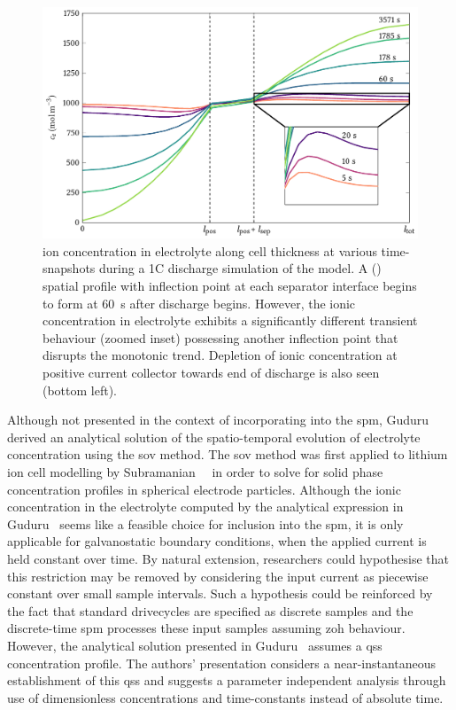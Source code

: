 \begin{figure}[!htp]
    \centering
    \includegraphics{4/figures/ce_1C_at_various_times.pdf}
    \caption[Electrolyte conc.\ (time-snapshots) along cell thickness for 1C
    discharge]{ ion concentration in electrolyte along cell thickness
        at various time-snapshots during a 1C discharge simulation of the
         model. A  () spatial
        profile  with inflection point at each separator interface begins to
        form at \approx \SI{60}{\second} after discharge begins. However, the
        ionic concentration in electrolyte exhibits a significantly different
        transient behaviour (zoomed inset) possessing another inflection point
        that disrupts the monotonic trend. Depletion of ionic concentration at
        positive current collector  towards end of discharge is also seen
    (bottom left).}
    \label{fig:ce1cdischgwithzoom}
\end{figure}

Although  not presented  in the  context  of incorporating  into the  \gls{spm},
Guduru~\etal~\cite{Guduru2012}   derived   an   analytical   solution   of   the
spatio-temporal  evolution  of  electrolyte concentration  using  the  \gls{sov}
method. The \gls{sov} method was first  applied to lithium ion cell modelling by
Subramanian~\etal~\cite{Subramanian2001a}  in order  to  solve  for solid  phase
concentration  profiles in  spherical  electrode particles.  Although the  ionic
concentration  in  the electrolyte  computed  by  the analytical  expression  in
Guduru~\etal{} seems like a feasible choice for inclusion into the \gls{spm}, it
is only applicable for galvanostatic boundary conditions, \ie{} when the applied
current  is held  constant over  time. By  natural extension,  researchers could
hypothesise  that this  restriction  may  be removed  by  considering the  input
current as  piecewise constant  over small sample  intervals. Such  a hypothesis
could  be  reinforced  by  the  fact that  standard  drivecycles  are  specified
as  discrete  samples and  the  discrete-time  \gls{spm} processes  these  input
samples assuming \gls{zoh} behaviour. However, the analytical solution presented
in  Guduru~\etal{}  assumes  a  \gls{qss} concentration  profile.  The  authors'
presentation  considers a  near-instantaneous  establishment  of this  \gls{qss}
and  suggests a  parameter  independent analysis  through  use of  dimensionless
concentrations and time-constants instead of absolute time.


